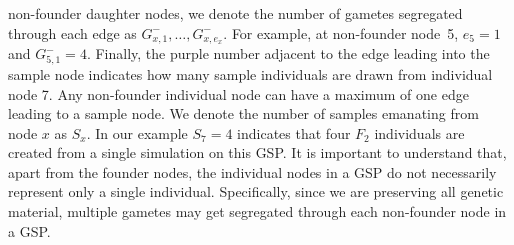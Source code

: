 non-founder daughter nodes, we denote the number of gametes segregated
through each edge as $G^{-}_{x, 1},\ldots,G^{-}_{x, e_x}$.  For example, at
non-founder node~5, $e_5 = 1$ and $G^{-}_{5,1}=4$.
Finally, the purple number adjacent to the edge leading into the
sample node indicates how many sample individuals are drawn from individual
node 7. Any non-founder individual node can have a maximum of one edge leading
to a sample node.  We denote the number of samples emanating from node $x$ as $S_x$. In our example $S_7=4$ indicates that four $F_2$ individuals are
created from a single simulation on this GSP.
It is important to understand that, apart from the founder nodes, the individual
nodes in a GSP do not necessarily represent only a single individual.  Specifically,
since we are preserving all genetic material, multiple gametes may get segregated
through each non-founder node in a GSP\@.

